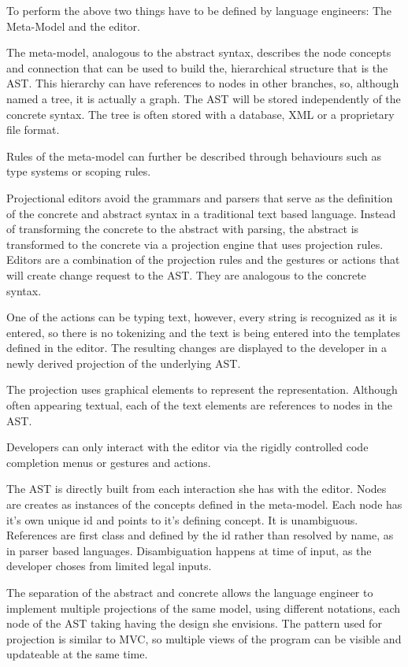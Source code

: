 To perform the above two things have to be defined by language engineers: The Meta-Model and the editor.

The meta-model, analogous to the abstract syntax, describes the node concepts and connection that can be used to build the, hierarchical structure that is the AST.
This hierarchy can have references to nodes in other branches, so, although named a tree, it is actually a graph.
The AST will be stored independently of the concrete syntax.
The tree is often stored with a database, XML or a proprietary file format.

Rules of the meta-model can further be described through behaviours such as type systems or scoping rules.

Projectional editors avoid the grammars and parsers that serve as the definition of the concrete and abstract syntax in a traditional text based language.
Instead of transforming the concrete to the abstract with parsing, the abstract is transformed to the concrete via a projection engine that uses projection rules.
Editors are a combination of the projection rules and the gestures or actions that will create change request to the AST.
They are analogous to the concrete syntax.

One of the actions can be typing text, however, every string is recognized as it is entered, so there is no tokenizing and the text is being entered into the templates defined in the editor.
The resulting changes are displayed to the developer in a newly derived projection of the underlying AST.

The projection uses graphical elements to represent the representation.
Although often appearing textual, each of the text elements are references to nodes in the AST.

Developers can only interact with the editor via the rigidly controlled code completion menus or gestures and actions. 
    
The AST is directly built from each interaction she has with the editor.
Nodes are creates as instances of the concepts defined in the meta-model.
Each node has it's own unique id and points to it's defining concept.
It is unambiguous.
References are first class and defined by the id rather than resolved by name, as in parser based languages.
Disambiguation happens at time of input, as the developer choses from limited legal inputs.

The separation of the abstract and concrete allows the language engineer to implement multiple projections of the same model, using different notations, each node of the AST taking having the design she envisions.
The pattern used for projection is similar to MVC, so multiple views of the program can be visible and updateable at the same time.

